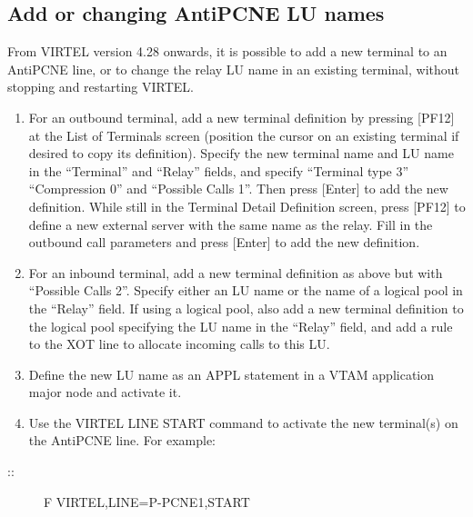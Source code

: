 \documentclass[letterpaper,10pt,english]{sphinxmanual}
\begin{document}
\subsection{Add or changing AntiPCNE LU names}
\label{\detokenize{connectivity_guide:add-or-changing-antipcne-lu-names}}\label{\detokenize{connectivity_guide:index-86}}
From VIRTEL version 4.28 onwards, it is possible to add a new terminal to an AntiPCNE line, or to change the relay LU name in an existing terminal, without stopping and restarting VIRTEL.

\begin{enumerate}
\def\theenumi{\arabic{enumi}}
\def\labelenumi{\theenumi .}
\makeatletter\def\p@enumii{\p@enumi \theenumi .}\makeatother
\item {} 
For an outbound terminal, add a new terminal definition by pressing {[}PF12{]} at the List of Terminals screen (position the cursor on an existing terminal if desired to copy its definition). Specify the new terminal name and LU name in the “Terminal” and “Relay” fields, and specify “Terminal type 3” “Compression 0” and “Possible Calls 1”. Then press {[}Enter{]} to add the new definition. While still in the Terminal Detail Definition screen, press {[}PF12{]} to define a new external server with the same name as the relay. Fill in the outbound   call parameters and press {[}Enter{]} to add the new definition.

\item {} 
For an inbound terminal, add a new terminal definition as above but with “Possible Calls 2”. Specify either an LU name or the name of a logical pool in the “Relay” field. If using a logical pool, also add a new terminal definition to the logical pool specifying the LU name in the “Relay” field, and add a rule to the XOT line to allocate incoming calls to this LU.

\item {} 
Define the new LU name as an APPL statement in a VTAM application major node and activate it.

\item {} 
Use the VIRTEL LINE START command to activate the new terminal(s) on the AntiPCNE line. For example:

\end{enumerate}
\begin{description}
\item[{::}] \leavevmode
F VIRTEL,LINE=P-PCNE1,START

\end{description}
\end{document}
